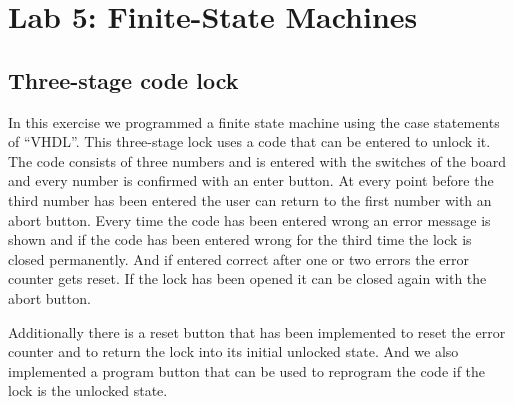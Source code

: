 \chapter{Lab 5: Finite-State Machines} \label{day5}

\section{Three-stage code lock}

In this exercise we programmed a finite state machine using the case statements of ``VHDL''. This three-stage lock uses a code that can be entered to unlock it. The code consists of three numbers and is entered with the switches of the board and every number is confirmed with an enter button. At every point before the third number has been entered the user can return to the first number with an abort button. Every time the code has been entered wrong an error message is shown and if the code has been entered wrong for the third time the lock is closed permanently. And if entered correct after one or two errors the error counter gets reset. If the lock has been opened it can be closed again with the abort button.

Additionally there is a reset button that has been implemented to reset the error counter and to return the lock into its initial unlocked state. And we also implemented a program button that can be used to reprogram the code if the lock is the unlocked state.


